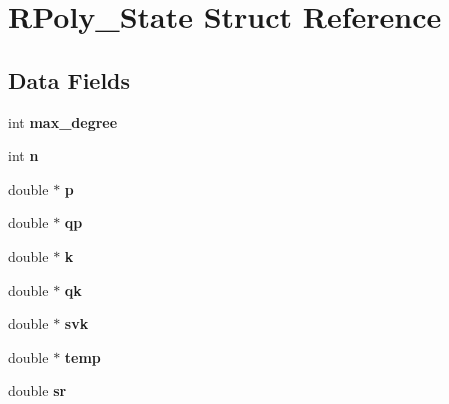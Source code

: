 \hypertarget{struct_r_poly___state}{}\section{R\+Poly\+\_\+\+State Struct Reference}
\label{struct_r_poly___state}
\subsection*{Data Fields}
\begin{DoxyCompactItemize}
\item 
\mbox{\label{struct_r_poly___state_a8eabc621540d71c2a7e3076d6c3826bc}} 
int {\bfseries max\+\_\+degree}
\item 
\mbox{\label{struct_r_poly___state_a76f11d9a0a47b94f72c2d0e77fb32240}} 
int {\bfseries n}
\item 
\mbox{\label{struct_r_poly___state_a581f9e6b0ae1bb5b0a323185403461cf}} 
double $\ast$ {\bfseries p}
\item 
\mbox{\label{struct_r_poly___state_add54d4105f979f122bc3a7b2543ea6de}} 
double $\ast$ {\bfseries qp}
\item 
\mbox{\label{struct_r_poly___state_a24209e3d6a9400c0ae32208f7c0c40f5}} 
double $\ast$ {\bfseries k}
\item 
\mbox{\label{struct_r_poly___state_a718f4cb6b5d0889a92892c2babee622a}} 
double $\ast$ {\bfseries qk}
\item 
\mbox{\label{struct_r_poly___state_aa59d711f886b181955bbb39849942cb9}} 
double $\ast$ {\bfseries svk}
\item 
\mbox{\label{struct_r_poly___state_a5ba843ea941644bfad9c98c84d85d910}} 
double $\ast$ {\bfseries temp}
\item 
\mbox{\label{struct_r_poly___state_a866899e74209205c48e6ffe4889887a3}} 
double {\bfseries sr}
\item 
\mbox{\label{struct_r_poly___state_a592a15876164ef5c9e5e500124619412}} 

\end{DoxyCompactItemize}
